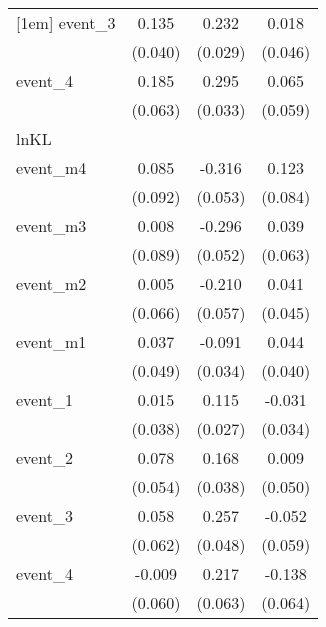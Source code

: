{\begin{tabular}{l*{3}{c}}
[1em]
event\_3     &       0.135\sym{***}&       0.232\sym{***}&       0.018         \\
            &     (0.040)         &     (0.029)         &     (0.046)         \\
[1em]
event\_4     &       0.185\sym{**} &       0.295\sym{***}&       0.065         \\
            &     (0.063)         &     (0.033)         &     (0.059)         \\
\hline
lnKL        &                     &                     &                     \\
event\_m4    &       0.085         &      -0.316\sym{***}&       0.123         \\
            &     (0.092)         &     (0.053)         &     (0.084)         \\
[1em]
event\_m3    &       0.008         &      -0.296\sym{***}&       0.039         \\
            &     (0.089)         &     (0.052)         &     (0.063)         \\
[1em]
event\_m2    &       0.005         &      -0.210\sym{***}&       0.041         \\
            &     (0.066)         &     (0.057)         &     (0.045)         \\
[1em]
event\_m1    &       0.037         &      -0.091\sym{**} &       0.044         \\
            &     (0.049)         &     (0.034)         &     (0.040)         \\
[1em]
event\_1     &       0.015         &       0.115\sym{***}&      -0.031         \\
            &     (0.038)         &     (0.027)         &     (0.034)         \\
[1em]
event\_2     &       0.078         &       0.168\sym{***}&       0.009         \\
            &     (0.054)         &     (0.038)         &     (0.050)         \\
[1em]
event\_3     &       0.058         &       0.257\sym{***}&      -0.052         \\
            &     (0.062)         &     (0.048)         &     (0.059)         \\
[1em]
event\_4     &      -0.009         &       0.217\sym{***}&      -0.138\sym{*}  \\
            &     (0.060)         &     (0.063)         &     (0.064)         \\

\end{tabular}}
